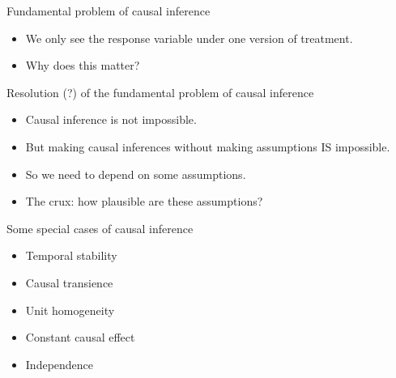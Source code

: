 \documentclass[xcolor={dvipsnames},handout]{beamer}
\begin{document}

\begin{frame}{Fundamental problem of causal inference}

\begin{itemize}
\item We only see the response variable under one version of treatment.
\item Why does this matter?
\end{itemize}

\end{frame}



\begin{frame}{Resolution (?) of the fundamental problem of causal inference}

\begin{itemize}
\item Causal inference is not impossible. 
\item But making causal inferences without making assumptions IS impossible. 
\item So we need to depend on some assumptions. 
\item The crux: how plausible are these assumptions?
\end{itemize}

\end{frame}



\begin{frame}{Some special cases of causal inference}

\begin{itemize}
\item Temporal stability 
\item Causal transience 
\item Unit homogeneity 
\item Constant causal effect 
\item Independence
\end{itemize}

\end{frame}
\end{document}
